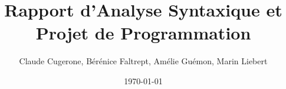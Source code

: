 \documentclass[10pt,a4paper]{report}
\begin{document}
\title{Rapport d'Analyse Syntaxique et Projet de Programmation}


\date{\today}

\author{Claude Cugerone, Bérénice Faltrept, Amélie Guémon, Marin Liebert}
\end{document}
